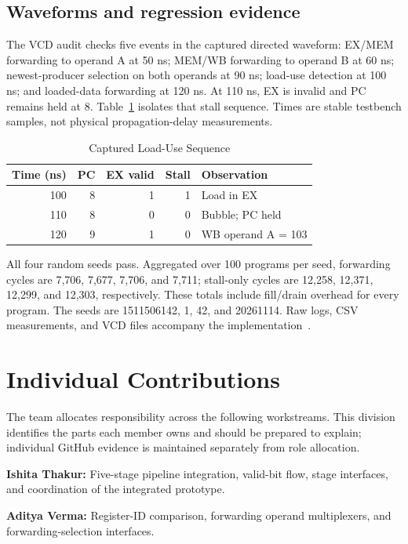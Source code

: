 \documentclass[conference]{IEEEtran}
\begin{document}
\subsection{Waveforms and regression evidence}
The VCD audit checks five events in the captured directed waveform: EX/MEM forwarding to operand A at 50 ns; MEM/WB forwarding to operand B at 60 ns; newest-producer selection on both operands at 90 ns; load-use detection at 100 ns; and loaded-data forwarding at 120 ns. At 110 ns, EX is invalid and PC remains held at 8. Table~\ref{tab:wave} isolates that stall sequence. Times are stable testbench samples, not physical propagation-delay measurements.

\begin{table}[t]
\caption{Captured Load-Use Sequence}
\label{tab:wave}\centering
\begin{tabular}{rrrrl}
\toprule Time (ns) & PC & EX valid & Stall & Observation\\\midrule
100 & 8 & 1 & 1 & Load in EX\\
110 & 8 & 0 & 0 & Bubble; PC held\\
120 & 9 & 1 & 0 & WB operand A = 103\\\bottomrule
\end{tabular}
\end{table}

All four random seeds pass. Aggregated over 100 programs per seed, forwarding cycles are 7,706, 7,677, 7,706, and 7,711; stall-only cycles are 12,258, 12,371, 12,299, and 12,303, respectively. These totals include fill/drain overhead for every program. The seeds are 1511506142, 1, 42, and 20261114. Raw logs, CSV measurements, and VCD files accompany the implementation~\cite{repo}.

\section{Individual Contributions}
The team allocates responsibility across the following workstreams. This division identifies the parts each member owns and should be prepared to explain; individual GitHub evidence is maintained separately from role allocation.

\textbf{Ishita Thakur:} Five-stage pipeline integration, valid-bit flow, stage interfaces, and coordination of the integrated prototype.

\textbf{Aditya Verma:} Register-ID comparison, forwarding operand multiplexers, and forwarding-selection interfaces.
\end{document}
